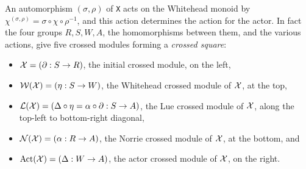 \documentclass[a4paper,11pt]{report}
\begin{document}
{{{ An automorphism $( \sigma, \rho )$ of \texttt{X} acts on the Whitehead monoid by $\chi^{(\sigma,\rho)} = \sigma \circ \chi \circ \rho^{-1}$, and this action determines the action for the actor. In fact the four groups $R, S, W, A$, the homomorphisms between them, and the various actions, give five crossed
modules forming a \emph{crossed square}:  
\begin{itemize}
\item  ${\cal X} = (\partial : S \to R)$,\texttt{} the initial crossed module, on the left, 
\item  ${\cal W(X)} = (\eta : S \to W)$,\texttt{} the Whitehead crossed module of ${\cal X}$, at the top, 
\item  ${\cal L(X)} = (\Delta\circ\eta = \alpha\circ\partial : S \to A)$,\texttt{} the Lue crossed module of ${\cal X}$, along the top-left to bottom-right diagonal, 
\item  ${\cal N(X)} = (\alpha : R \to A)$,\texttt{} the Norrie crossed module of ${\cal X}$, at the bottom, and 
\item  ${\rm Act}({\cal X}) = ( \Delta : W \to A)$,\texttt{} the actor crossed module of ${\cal X}$, on the right. 
\end{itemize}
 }

 
\begin{Verbatim}[commandchars=!@|,fontsize=\small,frame=single,label=Example]
  

\end{Verbatim}}}
\end{document}
